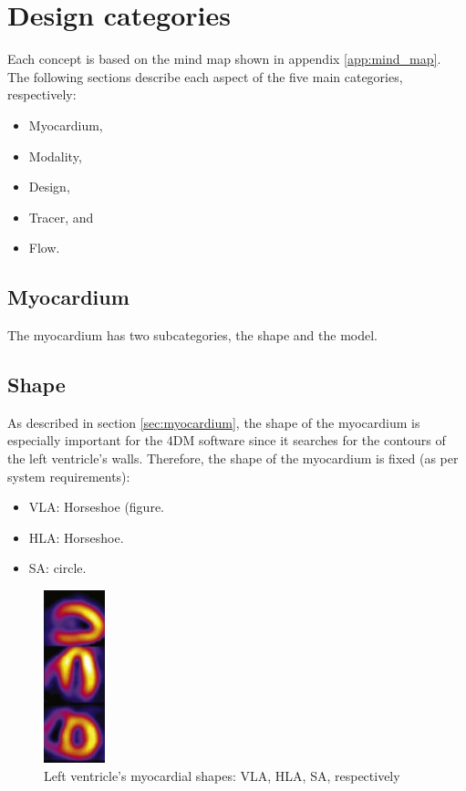 \section{Design categories}
Each concept is based on the mind map shown in appendix \ref{app:mind_map}. The following sections describe each aspect of the five main categories, respectively:
\begin{itemize}[noitemsep]
	\item Myocardium,
	\item Modality,
	\item Design,
	\item Tracer, and
	\item Flow.
\end{itemize}
\subsection{Myocardium}
The myocardium has two subcategories, the shape and the model.
\subsection*{Shape}
As described in section \ref{sec:myocardium}, the shape of the myocardium is especially important for the 4DM software since it searches for the contours of the left ventricle's walls. Therefore, the shape of the myocardium is fixed (as per system requirements):

\begin{center}
\begin{minipage}{0.3\textwidth}
\begin{itemize}
	\item \ac{VLA}: Horseshoe (figure.
	\item \ac{HLA}: Horseshoe.
	\item \ac{SA}: circle.
\end{itemize}
\end{minipage}%
\begin{minipage}{0.3\textwidth}
\begin{figure}[H]
	\includegraphics[height=5cm]{./images/stacked_shapes.jpg}
	\caption{Left ventricle's myocardial shapes: VLA, HLA, SA, respectively \citep{niwaz2015pres}}
	\label{fig:ventr_shape}
\end{figure}
\end{minipage}
\end{center}
